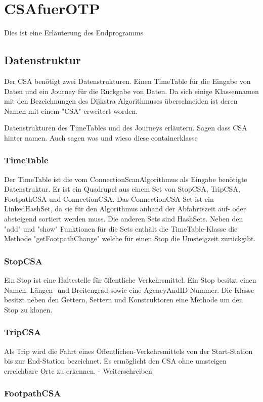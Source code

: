 \section{CSAfuerOTP}
Dies ist eine Erläuterung des Endprogramms

\subsection{Datenstruktur}
Der CSA benötigt zwei Datenstrukturen. Einen TimeTable für die Eingabe von Daten und ein Journey für die Rückgabe von Daten. Da sich einige Klassennamen mit den Bezeichnungen des Dijkstra Algorithmuses überschneiden ist deren Namen mit einem "CSA"  erweitert worden.

Datenstrukturen des TimeTables und des Journeys erläutern. Sagen dass CSA hinter namen. Auch sagen was und wieso diese containerklasse
\subsubsection{TimeTable}
Der TimeTable ist die vom ConnectionScanAlgorithmus als Eingabe benötigte Datenstruktur. Er ist ein Quadrupel aus einem Set von StopCSA, TripCSA, FootpathCSA und ConnectionCSA. Das ConnectionCSA-Set ist ein LinkedHashSet, da sie für den Algorithmus anhand der Abfahrtszeit auf- oder absteigend sortiert werden muss. Die anderen Sets sind HashSets. Neben den "add" und "show" Funktionen für die Sets enthält die TimeTable-Klasse die Methode "getFootpathChange" welche für einen Stop die Umsteigzeit zurückgibt.

\subsubsection{StopCSA}
Ein Stop ist eine Haltestelle für öffentliche Verkehrsmittel. Ein Stop besitzt einen Namen, Längen- und Breitengrad sowie eine AgencyAndID-Nummer. Die Klasse besitzt neben den Gettern, Settern und Konstruktoren eine Methode um den Stop zu klonen. 

\subsubsection{TripCSA}
Als Trip wird die Fahrt eines Öffentlichen-Verkehrsmittels von der Start-Station bis zur End-Station bezeichnet. Es ermöglicht den CSA ohne umsteigen erreichbare Orte zu erkennen.
- Weiterschreiben

\subsubsection{FootpathCSA}

